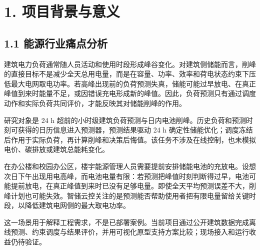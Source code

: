 \documentclass[12pt,a4paper]{article}
\begin{document}
\section{1. 项目背景与意义}
\subsection{1.1 能源行业痛点分析}
建筑电力负荷通常随人员活动和使用时段形成峰谷变化。对建筑侧储能而言，削峰的直接目标不是减少全天总用电量，而是在容量、功率、效率和荷电状态约束下压低最大电网取电功率。若高峰出现前的负荷预测失真，储能可能过早放电、在真正峰值到来时能量不足，或因错误充电形成新的峰值。因此，负荷预测只有通过调度动作和实际负荷共同评价，才能反映其对储能削峰的作用。\par
研究对象是 24 h 超前的小时级建筑负荷预测与日内电池削峰。历史负荷和预测时刻可获得的日历信息进入预测器，预测结果驱动 24 h 确定性储能优化；调度冻结后作用于实际负荷，再计算削峰和决策后悔值。该任务不涉及在线控制，也未模拟电价、碳排放或建筑总能耗变化。\par
在办公楼和校园办公区，楼宇能源管理人员需要提前安排储能电池的充放电。设想次日下午出现用电高峰，而电池电量有限：若预测把峰值时刻判断得过早，电池可能提前放电，在真正峰值到来时已没有足够电量。即使全天平均预测误差不大，削峰计划也可能失效。智储云控关注的是预测能否帮助使用者把有限电量留给关键时段，以降低建筑电网侧的最大取电功率。\par
这一场景用于解释工程需求，不是已部署案例。当前项目通过公开建筑数据完成离线预测、约束调度与结果评价，并用可视化原型支持方案比较；现场接入和运行收益仍待验证。\par
\end{document}

